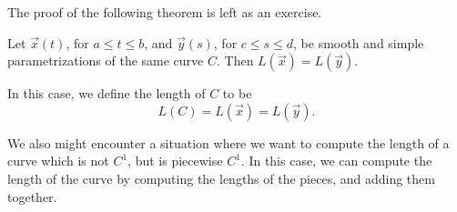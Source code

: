 \documentclass{ximera}
\begin{document}
The proof of the following theorem is left as an exercise. 

\begin{theorem}
Let $\vec{x}(t)$, for $a\leq t\leq b$, and $\vec{y}(s)$, for $c\leq s\leq d$, be smooth and simple parametrizations of the same curve $C$. Then $L(\vec{x}) = L(\vec{y})$.

In this case, we define the length of $C$ to be
\[
L(C) = L(\vec{x}) = L(\vec{y}).
\]
\end{theorem}

We also might encounter a situation where we want to compute the length of a curve which is not $C^1$, but is piecewise $C^1$. In this case, we can compute the length of the curve by computing the lengths of the pieces, and adding them together.

\begin{image}
\end{image}
\end{document}
